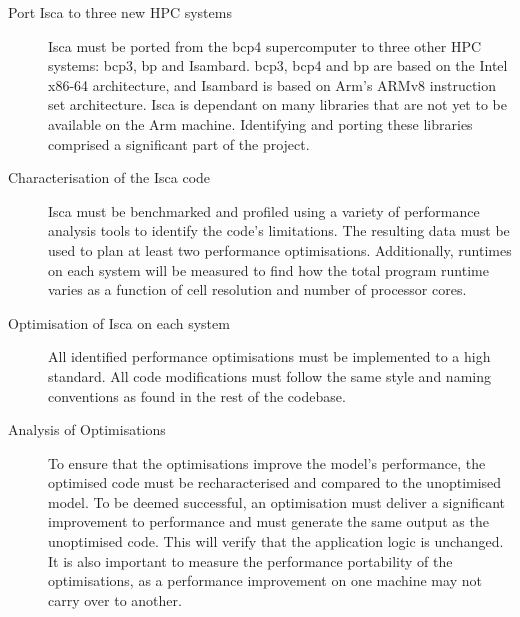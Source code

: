 \documentclass[a4paper,11pt]{report}
\begin{document}
\begin{description}
	\item[Port Isca to three new HPC systems] Isca must be ported from the \gls{bcp4} supercomputer to three other HPC systems: \gls{bcp3}, \gls{bp} and Isambard. \gls{bcp3}, \gls{bcp4} and \gls{bp} are based on the Intel x86-64 architecture, and Isambard is based on Arm's ARMv8 instruction set architecture. Isca is dependant on many libraries that are not yet to be available on the Arm machine. Identifying and porting these libraries comprised a significant part of the project.
	\item[Characterisation of the Isca code] Isca must be benchmarked and profiled using a variety of performance analysis tools to identify the code’s limitations. The resulting data must be used to plan at least two performance optimisations. Additionally, runtimes on each system will be measured to find how the total program runtime varies as a function of cell resolution and number of processor cores. 
	
	\item[Optimisation of Isca on each system] All identified performance optimisations must be implemented to a high standard. All code modifications must follow the same style and naming conventions as found in the rest of the codebase.
	
	\item[Analysis of Optimisations] To ensure that the optimisations improve the model’s performance, the optimised code must be recharacterised and compared to the unoptimised model. To be deemed successful, an optimisation must deliver a significant improvement to performance and must generate the same output as the unoptimised code. This will verify that the application logic is unchanged. It is also important to measure the performance portability of the optimisations, as a performance improvement on one machine may not carry over to another.
	
\end{description}
\end{document}

